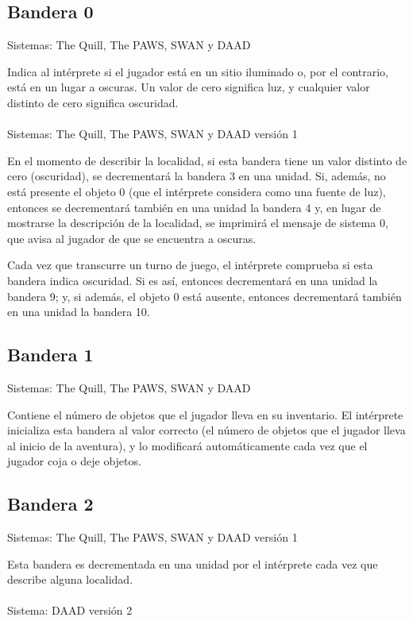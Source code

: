 \documentclass[11pt, a5paper]{article}
\newcommand{\quill}{\textsf{The Quill}\xspace}
\newcommand{\paw}{\textsf{The PAWS}\xspace}
\newcommand{\swan}{\textsf{SWAN}\xspace}
\newcommand{\daad}{\textsf{DAAD}\xspace}
\newcommand{\sistema}[1]{\noindent Sistema: #1 \nopagebreak}
\newcommand{\sistemas}[1]{\noindent Sistemas: #1 \nopagebreak}
\begin{document}
\subsection{Bandera 0}

\sistemas{\quill, \paw, \swan y \daad}

Indica al intérprete si el jugador está en un sitio iluminado o, por el contrario, está en un lugar a oscuras. Un valor de cero significa luz, y cualquier valor distinto de cero significa oscuridad.
\\\ \\
\sistemas{\quill, \paw, \swan y \daad versión 1}

En el momento de describir la localidad, si esta bandera tiene un valor distinto de cero (oscuridad), se decrementará la bandera 3 en una unidad. Si, además, no está presente el objeto 0 (que el intérprete considera como una fuente de luz), entonces se decrementará también en una unidad la bandera 4 y, en lugar de mostrarse la descripción de la localidad, se imprimirá el mensaje de sistema 0, que avisa al jugador de que se encuentra a oscuras.

Cada vez que transcurre un turno de juego, el intérprete comprueba si esta bandera indica oscuridad. Si es así, entonces decrementará en una unidad la bandera 9; y, si además, el objeto 0 está ausente, entonces decrementará también en una unidad la bandera 10.

\subsection{Bandera 1}\label{flag1}

\sistemas{\quill, \paw, \swan y \daad}

Contiene el número de objetos que el jugador lleva en su inventario. El intérprete inicializa esta bandera al valor correcto (el número de objetos que el jugador lleva al inicio de la aventura), y lo modificará automáticamente cada vez que el jugador coja o deje objetos.

\subsection{Bandera 2}

\sistemas{\quill, \paw, \swan y \daad versión 1}

Esta bandera es decrementada en una unidad por el intérprete cada vez que describe alguna localidad.
\\\ \\
\sistema{\daad versión 2}
\end{document}

